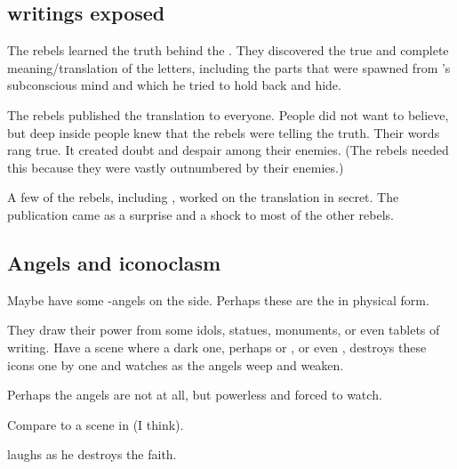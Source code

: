 \subsection{\Hoshiabalon writings exposed}
The rebels learned the truth behind the . 
They discovered the true and complete meaning/translation of the letters, including the parts that were spawned from 's subconscious mind and which he tried to hold back and hide. 

The rebels published the translation to everyone. 
People did not want to believe, but deep inside people knew that the rebels were telling the truth.
Their words rang true. 
It created doubt and despair among their enemies. 
(The rebels needed this because they were vastly outnumbered by their enemies.)

A few of the rebels, including \Azraid, worked on the translation in secret. 
The publication came as a surprise and a shock to most of the other rebels. 









\subsection{Angels and iconoclasm}
Maybe have some \uber-angels on the \Merkyran{} side. Perhaps these are the  in physical form. 

They draw their power from some idols, statues, monuments, or even tablets of writing. Have a scene where a dark one, perhaps \Morcariel{} or \Ramiel, or even \Sithiyacaan, destroys these icons one by one and watches as the angels weep and weaken. 

Perhaps the angels are not \uber{} at all, but powerless and forced to watch. 

Compare to a scene in  (I think). 


\Zachirah{} laughs as he destroys the \Merkyran{} faith. 

